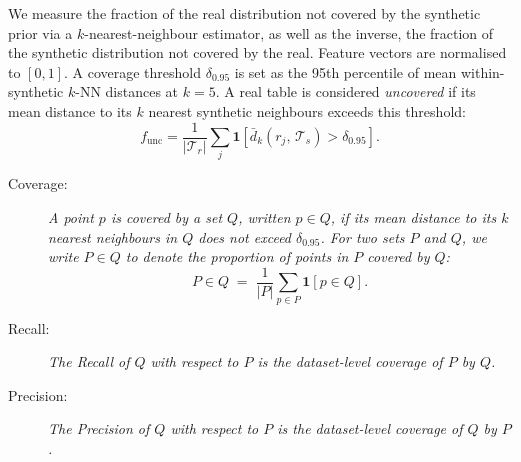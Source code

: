 \documentclass{article}
\begin{document}
We measure the fraction of the real distribution not covered by the synthetic prior via a $k$-nearest-neighbour estimator, as well as the inverse, the fraction of the synthetic distribution not covered by the real.
Feature vectors are normalised to $[0, 1]$. 
A coverage threshold $\delta_{0.95}$ is set as the 95th percentile of mean within-synthetic $k$-NN distances at $k = 5$. 
A real table is considered \emph{uncovered} if its mean distance to its $k$ nearest
synthetic neighbours exceeds this threshold:
\begin{equation}
    f_{\text{unc}} = \frac{1}{|\mathcal{T}_r|}\sum_j \mathbf{1}\!\left[\bar{d}_k(r_j,\, \mathcal{T}_s) > \delta_{0.95}\right].
\end{equation}

\begin{description}
    \item[Coverage:] \textit{A point $p$ is \emph{covered} by a set $Q$, written $p \in Q$,
    if its mean distance to its $k$ nearest neighbours in $Q$ does not exceed $\delta_{0.95}$.
    For two sets $P$ and $Q$, we write $P \in Q$ to denote the proportion of points
    in $P$ covered by $Q$:}
    \begin{equation}
        P \in Q \;=\; \frac{1}{|P|}\sum_{p \in P} \mathbf{1}[p \in Q].
    \end{equation}

    \item[Recall:] \textit{The \emph{Recall} of $Q$ with respect to $P$ is the dataset-level
    coverage of $P$ by $Q$.}

    \item[Precision:] \textit{The \emph{Precision} of $Q$ with respect to $P$ is the dataset-level
    coverage of $Q$ by $P$.}
\end{description}
\end{document}
